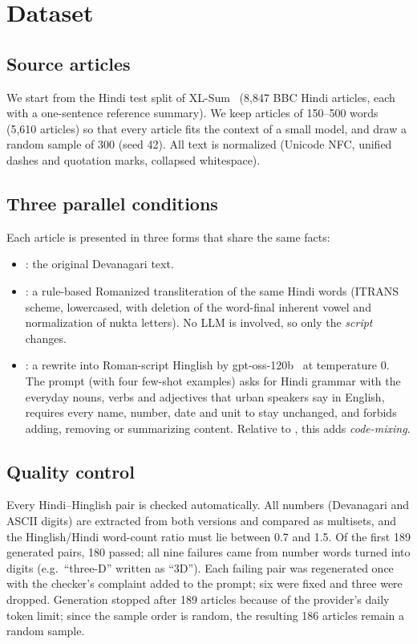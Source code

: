 \section{Dataset}
\label{sec:dataset}

\subsection{Source articles}
We start from the Hindi test split of XL-Sum~\cite{hasan2021xlsum} (8,847 BBC Hindi articles, each with a one-sentence reference summary). We keep articles of 150--500 words (5,610 articles) so that every article fits the context of a small model, and draw a random sample of 300 (seed 42). All text is normalized (Unicode NFC, unified dashes and quotation marks, collapsed whitespace).

\subsection{Three parallel conditions}
Each article is presented in three forms that share the same facts:
\begin{itemize}
  \item {}: the original Devanagari text.
  \item {}: a rule-based Romanized transliteration of the same Hindi words (ITRANS scheme, lowercased, with deletion of the word-final inherent vowel and normalization of nukta letters). No LLM is involved, so only the \emph{script} changes.
  \item {}: a rewrite into Roman-script Hinglish by gpt-oss-120b~\cite{openai2025gptoss} at temperature 0. The prompt (with four few-shot examples) asks for Hindi grammar with the everyday nouns, verbs and adjectives that urban speakers say in English, requires every name, number, date and unit to stay unchanged, and forbids adding, removing or summarizing content. Relative to , this adds \emph{code-mixing}.
\end{itemize}

\subsection{Quality control}
Every Hindi--Hinglish pair is checked automatically. All numbers (Devanagari and ASCII digits) are extracted from both versions and compared as multisets, and the Hinglish/Hindi word-count ratio must lie between 0.7 and 1.5. Of the first 189 generated pairs, 180 passed; all nine failures came from number words turned into digits (e.g.\ ``three-D'' written as ``3D''). Each failing pair was regenerated once with the checker's complaint added to the prompt; six were fixed and three were dropped. Generation stopped after 189 articles because of the provider's daily token limit; since the sample order is random, the resulting 186 articles remain a random sample.

